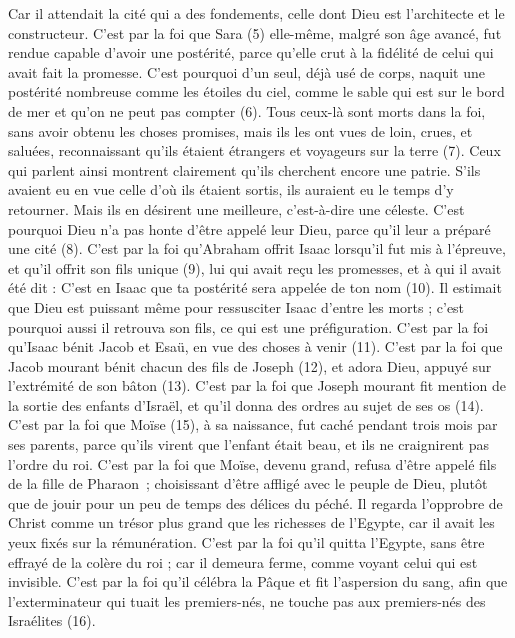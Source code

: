 \begin{multicols}{2}
Car il attendait la cité qui a des fondements, celle dont Dieu est l'architecte et le constructeur.
C’est par la foi que Sara (5) elle-même, malgré son âge avancé, fut rendue capable d’avoir une postérité, parce qu’elle crut à la fidélité de celui qui avait fait la promesse.
C'est pourquoi d'un seul, déjà usé de corps, naquit une postérité nombreuse comme les étoiles du ciel, comme le sable qui est sur le bord de mer et qu’on ne peut pas compter (6).
Tous ceux-là sont morts dans la foi, sans avoir obtenu les choses promises, mais ils les ont vues de loin, crues, et saluées, reconnaissant qu'ils étaient étrangers et voyageurs sur la terre (7).
Ceux qui parlent ainsi montrent clairement qu'ils cherchent encore une patrie.
S’ils avaient eu en vue celle d’où ils étaient sortis, ils auraient eu le temps d’y retourner.
Mais ils en désirent une meilleure, c'est-à-dire une céleste. C’est pourquoi Dieu n’a pas honte d'être appelé leur Dieu, parce qu'il leur a préparé une cité (8).
C’est par la foi qu’Abraham offrit Isaac lorsqu’il fut mis à l’épreuve, et qu’il offrit son fils unique (9), lui qui avait reçu les promesses,
et à qui il avait été dit : C’est en Isaac que ta postérité sera appelée de ton nom (10).
Il estimait que Dieu est puissant même pour ressusciter Isaac d'entre les morts ; c'est pourquoi aussi il retrouva son fils, ce qui est une préfiguration.
C’est par la foi qu’Isaac bénit Jacob et Esaü, en vue des choses à venir (11).
C’est par la foi que Jacob mourant bénit chacun des fils de Joseph (12), et adora Dieu, appuyé sur l’extrémité de son bâton (13).
C’est par la foi que Joseph mourant fit mention de la sortie des enfants d'Israël, et qu’il donna des ordres au sujet de ses os (14).
C’est par la foi que Moïse (15), à sa naissance, fut caché pendant trois mois par ses parents, parce qu’ils virent que l’enfant était beau, et ils ne craignirent pas l’ordre du roi.
C’est par la foi que Moïse, devenu grand, refusa d'être appelé fils de la fille de Pharaon ;
choisissant d’être affligé avec le peuple de Dieu, plutôt que de jouir pour un peu de temps des délices du péché.
Il regarda l'opprobre de Christ comme un trésor plus grand que les richesses de l'Egypte, car il avait les yeux fixés sur la rémunération.
C’est par la foi qu’il quitta l'Egypte, sans être effrayé de la colère du roi ; car il demeura ferme, comme voyant celui qui est invisible.
C’est par la foi qu’il célébra la Pâque et fit l'aspersion du sang, afin que l’exterminateur qui tuait les premiers-nés, ne touche pas aux premiers-nés des Israélites (16).

\end{multicols}

